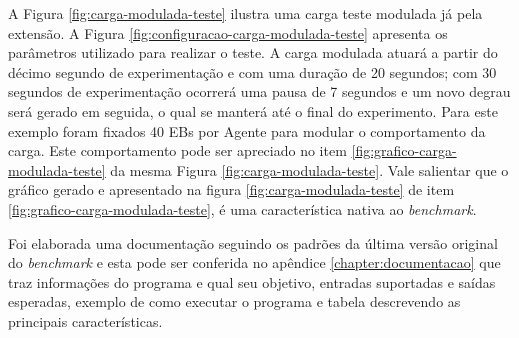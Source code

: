 A Figura \ref{fig:carga-modulada-teste} ilustra uma carga teste modulada já pela extensão. A Figura \ref{fig:configuracao-carga-modulada-teste} apresenta os parâmetros utilizado para realizar o teste. A carga modulada atuará a partir do décimo segundo de experimentação e com uma duração de 20 segundos; com 30 segundos de experimentação ocorrerá uma pausa de 7 segundos e um novo degrau será gerado em seguida, o qual se manterá até o final do experimento. Para este exemplo foram fixados 40 EBs por Agente para modular o comportamento da carga. Este comportamento pode ser apreciado no item \ref{fig:grafico-carga-modulada-teste} da mesma Figura \ref{fig:carga-modulada-teste}. Vale salientar que o gráfico gerado e apresentado na figura \ref{fig:carga-modulada-teste} de item \ref{fig:grafico-carga-modulada-teste}, é uma característica nativa ao \textit{benchmark}.

Foi elaborada uma documentação seguindo os padrões da última versão original do \textit{benchmark} e esta pode ser conferida no apêndice \ref{chapter:documentacao} que traz informações do programa e qual seu objetivo, entradas suportadas e saídas esperadas, exemplo de como executar o programa e tabela descrevendo as principais características.
